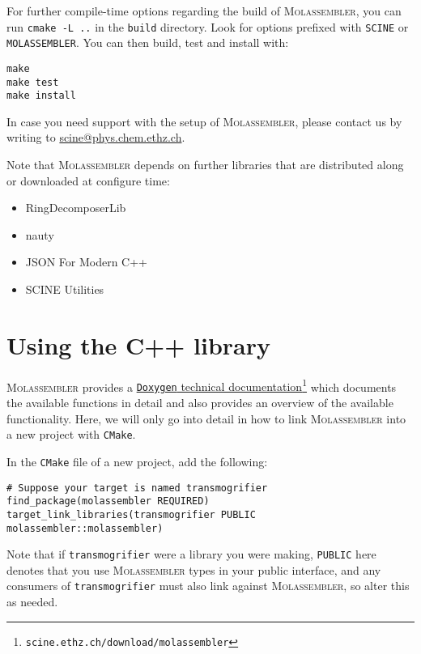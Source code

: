 \documentclass[]{tufte-book}
\begin{document}
For further compile-time options regarding the build of \textsc{Molassembler},
you can run \texttt{cmake -L ..} in the \texttt{build} directory. Look for
options prefixed with \texttt{SCINE} or \texttt{MOLASSEMBLER}. You can then
build, test and install with:

\begin{Verbatim}
make
make test
make install
\end{Verbatim}

In case you need support with the setup of \textsc{Molassembler}, please contact
us by writing to \href{mailto:scine@phys.chem.ethz.ch}{scine@phys.chem.ethz.ch}.

Note that \textsc{Molassembler} depends on further libraries that are
distributed along or downloaded at configure time:

\begin{itemize}
  \item RingDecomposerLib~\cite{Flachsenberg2017, Kolodzik2012} 
  \item nauty~\cite{McKay2014}
  \item JSON For Modern C++~\cite{Lohmann2013} 
  \item SCINE Utilities~\cite{Brunken2019}
\end{itemize}


\chapter{Using the C++ library}

\textsc{Molassembler} provides a
\href{https://scine.ethz.ch/static/download/documentation/molassembler/v1.2.1/cpp}{\texttt{Doxygen}
technical
documentation}\footnote{\texttt{scine.ethz.ch/download/molassembler}}
which documents the available functions in detail and also provides an overview
of the available functionality. Here, we will only go into detail in how to link
\textsc{Molassembler} into a new project with \texttt{CMake}.

In the \texttt{CMake} file of a new project, add the following:

\begin{Verbatim}
# Suppose your target is named transmogrifier
find_package(molassembler REQUIRED)
target_link_libraries(transmogrifier PUBLIC molassembler::molassembler)
\end{Verbatim}

Note that if \texttt{transmogrifier} were a library you were making,
\texttt{PUBLIC} here denotes that you use \textsc{Molassembler} types in your
public interface, and any consumers of \texttt{transmogrifier} must also link
against \textsc{Molassembler}, so alter this as needed.
\end{document}

